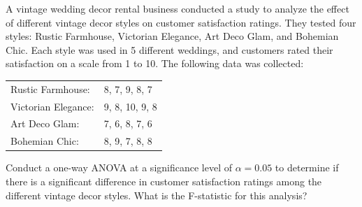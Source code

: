 \documentclass[border=10pt]{standalone}
\begin{document}
\begin{tcolorbox}[
    enhanced,
    colback=customgray,
    colframe=customblue,
    arc=8pt,
    boxrule=1.5pt,
    fontupper=\sffamily\large,
    width=\textwidth
]
A vintage wedding decor rental business conducted a study to analyze the effect of different vintage decor styles on customer satisfaction ratings. They tested four styles: Rustic Farmhouse, Victorian Elegance, Art Deco Glam, and Bohemian Chic. Each style was used in 5 different weddings, and customers rated their satisfaction on a scale from 1 to 10. The following data was collected:

\vspace{0.5em}
\begin{tabular}{ll}
Rustic Farmhouse: & 8, 7, 9, 8, 7 \\
Victorian Elegance: & 9, 8, 10, 9, 8 \\
Art Deco Glam: & 7, 6, 8, 7, 6 \\
Bohemian Chic: & 8, 9, 7, 8, 8
\end{tabular}
\vspace{0.5em}

Conduct a one-way ANOVA at a significance level of $\alpha = 0.05$ to determine if there is a significant difference in customer satisfaction ratings among the different vintage decor styles. What is the F-statistic for this analysis?
\end{tcolorbox}
\end{document}
